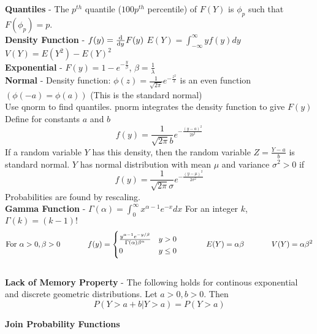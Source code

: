\documentclass{scrartcl}
\begin{document}
\textbf{Quantiles} - The $p^{th}$ quantile ($100p^{th}$ percentile) of $F(Y)$ is $\phi_p$ such that $F(\phi_p)=p$.\\

\textbf{Density Function} - $f(y) = \od{}{y}F(y)$ \hspace{0.5in} $E(Y) = \int_{-\infty}^{\infty}yf(y)dy$ \hspace{0.5in} $V(Y) = E(Y^2) - E(Y)^2$\\

\textbf{Exponential} - $F(y) = 1 - e^{-\frac{y}{\beta}}$, $\beta = \frac{1}{\lambda}$\\

\textbf{Normal} - Density function: $\phi(z) = \frac{1}{\sqrt{2\pi}}e^{-\frac{z^2}{2}}$ is an even function $\left(\phi(-a)=\phi(a)\right)$ (This is the standard normal)\\
Use qnorm to find quantiles. pnorm integrates the density function to give $F(y)$
Define for constants $a$ and $b$ $$f(y) = \frac{1}{\sqrt{2\pi}b}e^{-\frac{(y-a)^2}{2b^2}}$$ If a random variable $Y$ has this density, then the random variable $Z=\frac{Y-a}{b}$ is standard normal.
$Y$ has normal distribution with mean $\mu$ and variance $\sigma^2>0$ if $$f(y) = \frac{1}{\sqrt{2\pi}\sigma}e^{-\frac{(y-\mu)^2}{2\sigma^2}}$$ Probabilities are found by rescaling.\\

\textbf{Gamma Function} - $\Gamma(\alpha) = \int_0^\infty x^{\alpha-1}e^{-x}dx$ \hspace{0.5in} For an integer $k$, $\Gamma(k) = (k-1)!$
$$\text{For } \alpha>0, \beta>0 \text{\hspace{0.5in}} f(y) = \begin{cases} \frac{y^{\alpha-1}e^{-y/\beta}}{\Gamma(\alpha)\beta^\alpha} & y>0\\ 0 & y \le 0 \end{cases} \text{\hspace{0.5in}} E(Y) = \alpha\beta \text{\hspace{0.5in}} V(Y) = \alpha\beta^2$$\\

\textbf{Lack of Memory Property} - The following holds for continous exponential and discrete geometric distributions. Let $a>0, b>0$. Then $$P(Y>a+b|Y>a) = P(Y>a)$$

\newpage

\begin{Large}\textbf{Join Probability Functions}\end{Large}\\
\end{document}
